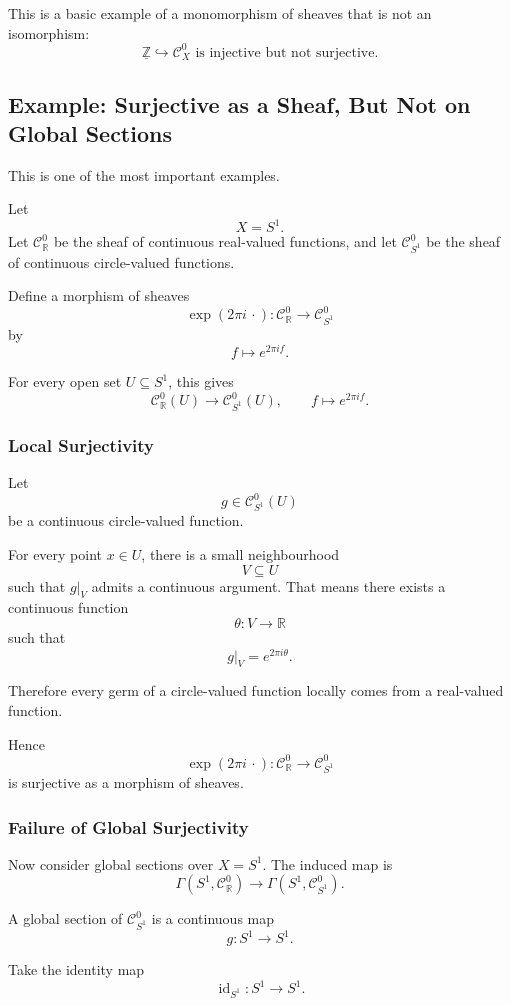 \documentclass[12pt,a4paper]{article}
\DeclareMathOperator{\id}{id}
\newcommand{\RR}{\mathbb{R}}
\newcommand{\ZZ}{\mathbb{Z}}
\newcommand{\Czero}{\mathcal C^0}        %
\theoremstyle{notespace}
\newcommand{\SSone}{S^1}
\begin{document}
This is a basic example of a monomorphism of sheaves that is not an isomorphism:
\[
\boxed{
	\underline{\ZZ}\hookrightarrow \Czero_X
	\text{ is injective but not surjective.}
}
\]

\subsection{Example: Surjective as a Sheaf, But Not on Global Sections}

This is one of the most important examples.

Let
\[
X=\SSone.
\]
Let \(\Czero_{\RR}\) be the sheaf of continuous real-valued functions, and let \(\Czero_{\SSone}\) be the sheaf of continuous circle-valued functions.

Define a morphism of sheaves
\[
\exp(2\pi i\,\cdot):\Czero_{\RR}\to \Czero_{\SSone}
\]
by
\[
f\mapsto e^{2\pi i f}.
\]

For every open set \(U\subseteq \SSone\), this gives
\[
\Czero_{\RR}(U)\to \Czero_{\SSone}(U),
\qquad
f\mapsto e^{2\pi i f}.
\]

\subsubsection*{Local Surjectivity}

Let
\[
g\in \Czero_{\SSone}(U)
\]
be a continuous circle-valued function.

For every point \(x\in U\), there is a small neighbourhood
\[
V\subseteq U
\]
such that \(g|_V\) admits a continuous argument. That means there exists a continuous function
\[
\theta:V\to \RR
\]
such that
\[
g|_V=e^{2\pi i\theta}.
\]

Therefore every germ of a circle-valued function locally comes from a real-valued function.

Hence
\[
\exp(2\pi i\,\cdot):\Czero_{\RR}\to \Czero_{\SSone}
\]
is surjective as a morphism of sheaves.

\subsubsection*{Failure of Global Surjectivity}

Now consider global sections over \(X=\SSone\). The induced map is
\[
\Gamma(\SSone,\Czero_{\RR})
\to
\Gamma(\SSone,\Czero_{\SSone}).
\]

A global section of \(\Czero_{\SSone}\) is a continuous map
\[
g:\SSone\to \SSone.
\]

Take the identity map
\[
\id_{\SSone}:\SSone\to \SSone.
\]
\end{document}
